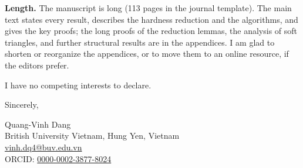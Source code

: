 \documentclass[11pt,a4paper]{article}
\begin{document}
\textbf{Length.} The manuscript is long (113 pages in the journal template). The main text states every result, describes the hardness reduction and the algorithms, and gives the key proofs; the long proofs of the reduction lemmas, the analysis of soft triangles, and further structural results are in the appendices. I am glad to shorten or reorganize the appendices, or to move them to an online resource, if the editors prefer.

I have no competing interests to declare.

Sincerely,

Quang-Vinh Dang\\
British University Vietnam, Hung Yen, Vietnam\\
\href{mailto:vinh.dq4@buv.edu.vn}{vinh.dq4@buv.edu.vn}\\
ORCID: \href{https://orcid.org/0000-0002-3877-8024}{0000-0002-3877-8024}
\end{document}
